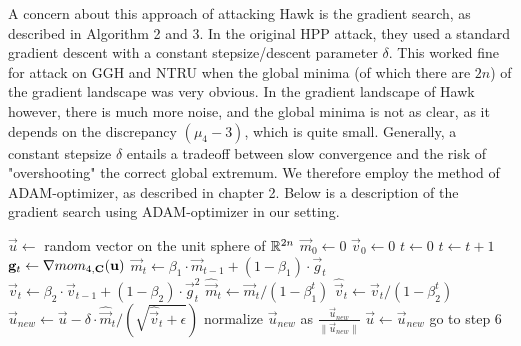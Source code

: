 A concern about this approach of attacking Hawk is the gradient search, as described in Algorithm 2 and 3. In the original HPP attack, they used a standard gradient descent with a constant stepsize/descent parameter $\delta$. This
worked fine for attack on GGH and NTRU when the global minima (of which there are $2n$) of the gradient landscape was very obvious. In the gradient landscape of Hawk however, there is much more noise, and the global minima is
not as clear, as it depends on the discrepancy $(\mu_4 - 3)$, which is quite small. Generally, a constant stepsize $\delta$ entails a tradeoff between slow convergence and the risk of "overshooting" the correct global extremum.  
We therefore employ the method of ADAM-optimizer, as described in chapter 2.
Below is a description of the gradient search using ADAM-optimizer in our setting.

\begin{algorithm}[H]
    \caption{$\mathsf{gradient \ descent \ ADAM}$}
\begin{algorithmic}[1]
    \State $\vec{u} \gets $ random vector on the unit sphere of $\mathbb{R}^{2n}$
    \State $\vec{m}_0 \gets 0$ 
    \State $\vec{v}_0 \gets 0$ 
    \State $t \gets 0$ 
    \Loop
    \State $t \gets t + 1$
    \State $\mathbf{g}_t \gets \nabla mom_{4, \mathbf{C}}(\mathbf{u})$
    \State $\vec{m}_t \gets \beta_1 \cdot \vec{m}_{t-1} + (1 - \beta_1) \cdot \vec{g}_t$
    \State $\vec{v}_t \gets \beta_2 \cdot \vec{v}_{t-1} + (1 - \beta_2) \cdot \vec{g}_t^2$
    \State $\hat{\vec{m}}_t \gets \vec{m}_t / (1 - \beta_1 ^t) $
    \State $\hat{\vec{v}}_t \gets \vec{v}_t / (1 - \beta_2 ^t) $
    \State $\vec{u}_{new} \gets \vec{u} - \delta \cdot \hat{\vec{m}}_t / (\sqrt{\hat{\vec{v}}_t + \epsilon})$ 
    \State normalize $\vec{u}_{new}$ as $\frac{\vec{u}_{new}}{\lVert \vec{u}_{new} \rVert}$
     
    \State {}
    \Else 
    \State $\vec{u} \gets \vec{u}_{new}$
    \State go to step 6
    \EndIf
    \EndLoop
\end{algorithmic}
\end{algorithm}

